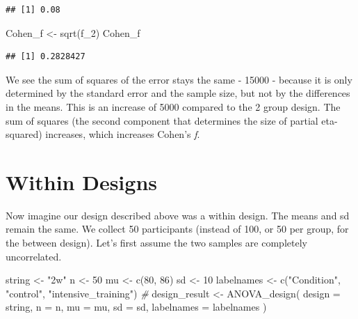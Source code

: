 \documentclass[
]{book}
\newenvironment{Shaded}{\begin{snugshade}}{\end{snugshade}}
\newcommand{\AttributeTok}[1]{\textcolor[rgb]{0.77,0.63,0.00}{#1}}
\newcommand{\CommentTok}[1]{\textcolor[rgb]{0.56,0.35,0.01}{\textit{#1}}}
\newcommand{\DecValTok}[1]{\textcolor[rgb]{0.00,0.00,0.81}{#1}}
\newcommand{\FunctionTok}[1]{\textcolor[rgb]{0.00,0.00,0.00}{#1}}
\newcommand{\NormalTok}[1]{#1}
\newcommand{\OtherTok}[1]{\textcolor[rgb]{0.56,0.35,0.01}{#1}}
\newcommand{\StringTok}[1]{\textcolor[rgb]{0.31,0.60,0.02}{#1}}
\begin{document}
\begin{verbatim}
## [1] 0.08
\end{verbatim}

\begin{Shaded}
\begin{Highlighting}[]
\NormalTok{Cohen\_f }\OtherTok{\textless{}{-}} \FunctionTok{sqrt}\NormalTok{(f\_2)}
\NormalTok{Cohen\_f}
\end{Highlighting}
\end{Shaded}

\begin{verbatim}
## [1] 0.2828427
\end{verbatim}

We see the sum of squares of the error stays the same - 15000 - because it is only determined by the standard error and the sample size, but not by the differences in the means. This is an increase of 5000 compared to the 2 group design. The sum of squares (the second component that determines the size of partial eta-squared) increases, which increases Cohen's \emph{f}.

\hypertarget{within-designs}{%
\section{Within Designs}\label{within-designs}}

Now imagine our design described above was a within design. The means and sd remain the same. We collect 50 participants (instead of 100, or 50 per group, for the between design). Let's first assume the two samples are completely uncorrelated.

\begin{Shaded}
\begin{Highlighting}[]
\NormalTok{string }\OtherTok{\textless{}{-}} \StringTok{"2w"}
\NormalTok{n }\OtherTok{\textless{}{-}} \DecValTok{50}
\NormalTok{mu }\OtherTok{\textless{}{-}} \FunctionTok{c}\NormalTok{(}\DecValTok{80}\NormalTok{, }\DecValTok{86}\NormalTok{)}
\NormalTok{sd }\OtherTok{\textless{}{-}} \DecValTok{10}
\NormalTok{labelnames }\OtherTok{\textless{}{-}} \FunctionTok{c}\NormalTok{(}\StringTok{"Condition"}\NormalTok{, }\StringTok{"control"}\NormalTok{, }\StringTok{"intensive\_training"}\NormalTok{) }\CommentTok{\#}
\NormalTok{design\_result }\OtherTok{\textless{}{-}} \FunctionTok{ANOVA\_design}\NormalTok{(}
  \AttributeTok{design =}\NormalTok{ string,}
  \AttributeTok{n =}\NormalTok{ n,}
  \AttributeTok{mu =}\NormalTok{ mu,}
  \AttributeTok{sd =}\NormalTok{ sd,}
  \AttributeTok{labelnames =}\NormalTok{ labelnames}
\NormalTok{)}
\end{Highlighting}
\end{Shaded}
\end{document}
